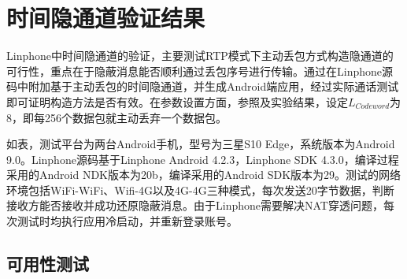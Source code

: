 \section{时间隐通道验证结果}
\label{chap:linphone:result}

Linphone中时间隐通道的验证，主要测试RTP模式下主动丢包方式构造隐通道的可行性，重点在于隐蔽消息能否顺利通过丢包序号进行传输。通过在Linphone源码中附加基于主动丢包的时间隐通道，并生成Android端应用，经过实际通话测试即可证明构造方法是否有效。在参数设置方面，参照及实验结果，设定$L_{Codeword}$为8，即每256个数据包就主动丢弃一个数据包。


如表，测试平台为两台Android手机，型号为三星S10 Edge，系统版本为Android 9.0。Linphone源码基于Linphone Android 4.2.3，Linphone SDK 4.3.0，编译过程采用的Android NDK版本为20b，编译采用的Android SDK版本为29。测试的网络环境包括WiFi-WiFi、Wifi-4G以及4G-4G三种模式，每次发送20字节数据，判断接收方能否接收并成功还原隐蔽消息。由于Linphone需要解决NAT穿透问题，每次测试时均执行应用冷启动，并重新登录账号。

\subsection{可用性测试}
\label{chap:linphone:result:availablity}


